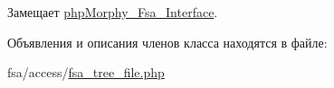 Замещает \hyperlink{interfacephpMorphy__Fsa__Interface_a6e249e8e54705e4c1d9399ff0e491ce0}{phpMorphy\_\-Fsa\_\-Interface}.



Объявления и описания членов класса находятся в файле:\begin{DoxyCompactItemize}
\item 
fsa/access/\hyperlink{fsa__tree__file_8php}{fsa\_\-tree\_\-file.php}\end{DoxyCompactItemize}
